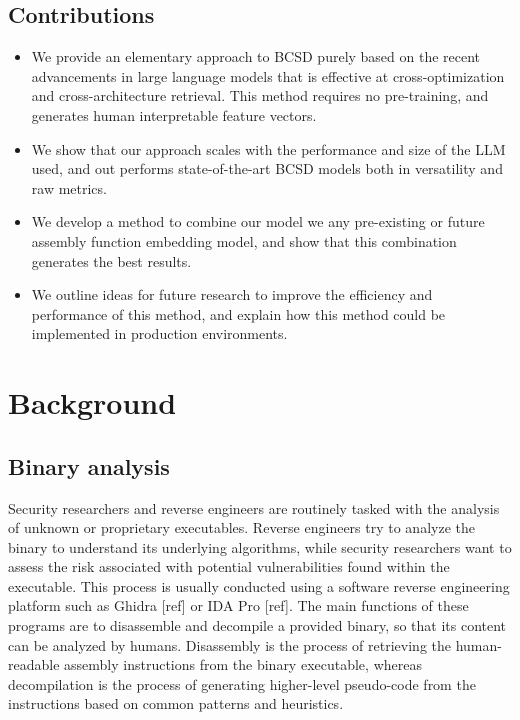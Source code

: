 \documentclass[conference,compsoc]{IEEEtran}
\begin{document}
\subsection{Contributions}

\begin{itemize}
\item We provide an elementary approach to BCSD purely based on the recent advancements in large language models that
    is effective at cross-optimization and cross-architecture retrieval. This method requires no pre-training, and
    generates human interpretable feature vectors.
\item We show that our approach scales with the performance and size of the LLM used, and out performs state-of-the-art BCSD models
    both in versatility and raw metrics.
\item We develop a method to combine our model we any pre-existing or future assembly function embedding model, and show that
    this combination generates the best results.
\item We outline ideas for future research to improve the efficiency and performance of this method, and explain how this method
    could be implemented in production environments.
\end{itemize}

\section{Background}

\subsection{Binary analysis}

Security researchers and reverse engineers are routinely tasked with the analysis of unknown or proprietary executables.
Reverse engineers try to analyze the binary to understand its underlying algorithms, while security researchers want to assess
the risk associated with potential vulnerabilities found within the executable. This process is usually conducted using
a software reverse engineering platform such as Ghidra [ref] or IDA Pro [ref]. The main functions of these programs are to
disassemble and decompile a provided binary, so that its content can be analyzed by humans. Disassembly is
the process of retrieving the human-readable assembly instructions from the binary executable, whereas decompilation
is the process of generating higher-level pseudo-code from the instructions based on common patterns and heuristics.
\end{document}
